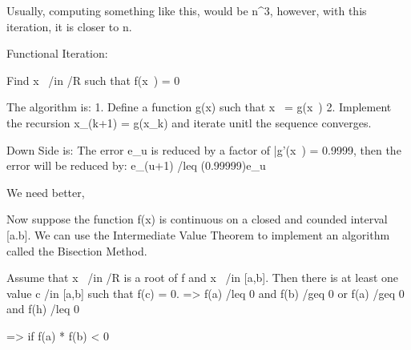 	Usually, computing something like this, would be n^3, however, with this iteration, 
	it is closer to n.


Functional Iteration:
	
	Find x~ /in /R such that f(x~) = 0

	The algorithm is:
		1. Define a function g(x) such that x~ = g(x~)
		2. Implement the recursion 
			x_(k+1) = g(x_k) and iterate unitl the sequence converges.

	Down Side is: The error e_u is reduced by a factor of |g'(x~) = 0.9999, then the error will be reduced by:
		e_(u+1) /leq (0.99999)e_u


We need better,

Now suppose the function f(x) is continuous on a closed and counded interval [a.b]. We can use the Intermediate Value Theorem to implement an algorithm called the Bisection Method.

Assume that x~ /in /R is a root of f and x~ /in [a,b]. Then there is at least one value c /in [a,b] such that f(c) = 0.
	=> f(a) /leq 0 and f(b) /geq 0
	   or
	   f(a) /geq 0 and f(h) /leq 0
	
	=> if f(a) * f(b) < 0
	
		
